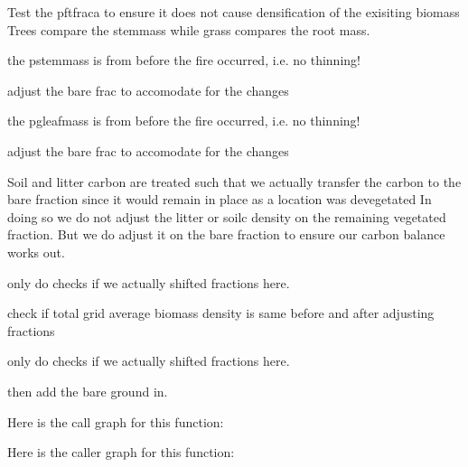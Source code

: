 Test the pftfraca to ensure it does not cause densification of the exisiting biomass Trees compare the stemmass while grass compares the root mass.

the pstemmass is from before the fire occurred, i.\+e. no thinning!

adjust the bare frac to accomodate for the changes

the pgleafmass is from before the fire occurred, i.\+e. no thinning!

adjust the bare frac to accomodate for the changes

Soil and litter carbon are treated such that we actually transfer the carbon to the bare fraction since it would remain in place as a location was devegetated In doing so we do not adjust the litter or soilc density on the remaining vegetated fraction. But we do adjust it on the bare fraction to ensure our carbon balance works out.

only do checks if we actually shifted fractions here.

check if total grid average biomass density is same before and after adjusting fractions

only do checks if we actually shifted fractions here.

then add the bare ground in. 

Here is the call graph for this function\+:




Here is the caller graph for this function\+:


